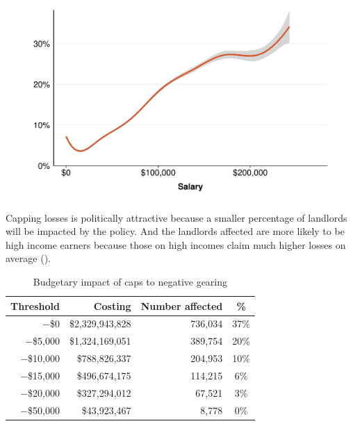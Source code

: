 \documentclass{grattan}\usepackage[]{graphicx}\usepackage[]{color}
\begin{document}
\begin{figure}

\includegraphics[width=\columnwidth]{CGT-NG-atlas//NG-vs-salary-1}
\end{figure}

Capping losses is politically attractive because a smaller percentage of landlords will be impacted by the policy. And the landlords affected are more likely to be high income earners because those on high incomes claim much higher losses on average (). 

\begin{table}
\caption{Budgetary impact of caps to negative gearing}\label{tbl:cap-NG}
\begin{tabular}{rrrS}
  \toprule
{\textbf{Threshold}} & {\textbf{Costing}} & {\textbf{Number affected}} & {\textbf{\%}} \\ 
  \midrule
$-$\$0 & \$2,329,943,828 & 736,034 & 37\% \\ 
  $-$\$5,000 & \$1,324,169,051 & 389,754 & 20\% \\ 
  $-$\$10,000 & \$788,826,337 & 204,953 & 10\% \\ 
  $-$\$15,000 & \$496,674,175 & 114,215 & 6\% \\ 
  $-$\$20,000 & \$327,294,012 & 67,521 & 3\% \\ 
  $-$\$50,000 & \$43,923,467 & 8,778 & 0\% \\ 
   \bottomrule
\end{tabular}

\end{table}
\end{document}

